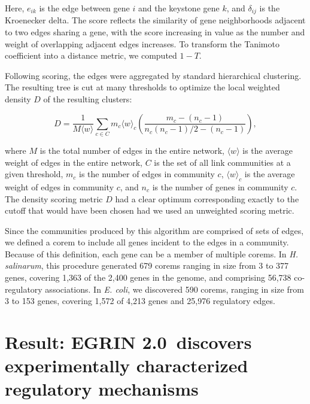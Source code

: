 \documentclass{article}
\newcommand{\tmsamp}[1]{\textsf{#1}}
\newcommand{\egrine}{{\tmsamp{EGRIN 2.0}}}
\begin{document}
\noindent Here, $e_{ik}$ is the edge between gene $i$ and the keystone gene $k$, and $\delta_{ij}$ is the Kroenecker delta. The score reflects the similarity of gene neighborhoods adjacent to two edges sharing a gene, with the score increasing in value as the number and weight of overlapping adjacent edges increases. To transform the Tanimoto coefficient into a distance metric, we computed $1-T$.

Following scoring, the edges were aggregated by standard hierarchical clustering. The resulting tree is cut at many thresholds to optimize the local weighted density $D$ of the resulting clusters:

\begin{equation}
D=\frac{1}{M\langle w\rangle}\sum_{c\in C}m_c\langle w\rangle_c\left(\frac{m_c-(n_c-1)}{n_c(n_c-1)/2-(n_c-1)}\right),
\end{equation}

\noindent where $M$ is the total number of edges in the entire network, $\langle w\rangle$ is the average weight of edges in the entire network, $C$ is the set of all link communities at a given threshold, $m_c$ is the number of edges in community $c$, $\langle w\rangle_c$ is the average weight of edges in community $c$, and $n_c$ is the number of genes in community $c$. The density scoring metric $D$ had a clear optimum corresponding exactly to the cutoff that would have been chosen had we used an unweighted scoring metric. 

Since the communities produced by this algorithm are comprised of sets of edges, we defined a corem to include all genes incident to the edges in a community. Because of this definition, each gene can be a member of multiple  corems. In {\it H. salinarum}, this procedure generated 679 corems ranging in size from 3 to 377 genes, covering 1,363 of the 2,400 genes in the genome, and comprising 56,738 co-regulatory associations. In {\it E. coli}, we discovered 590 corems, ranging in size from 3 to 153 genes, covering 1,572 of 4,213 genes and 25,976 regulatory edges.

\section{Result: \egrine~discovers experimentally characterized regulatory mechanisms}
\end{document}
